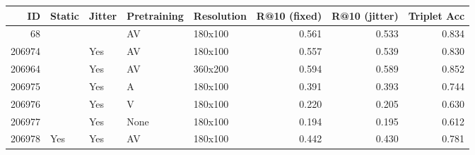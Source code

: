 \begin{tabular}{rllllrrr}
\toprule
    ID & Static & Jitter & Pretraining & Resolution &  R@10 (fixed) &  R@10 (jitter) &  Triplet Acc \\
\midrule
    68 &        &        &          AV &    180x100 &         0.561 &          0.533 &        0.834 \\
206974 &        &    Yes &          AV &    180x100 &         0.557 &          0.539 &        0.830 \\
206964 &        &    Yes &          AV &    360x200 &         0.594 &          0.589 &        0.852 \\
206975 &        &    Yes &           A &    180x100 &         0.391 &          0.393 &        0.744 \\
206976 &        &    Yes &           V &    180x100 &         0.220 &          0.205 &        0.630 \\
206977 &        &    Yes &        None &    180x100 &         0.194 &          0.195 &        0.612 \\
206978 &    Yes &    Yes &          AV &    180x100 &         0.442 &          0.430 &        0.781 \\
\bottomrule
\end{tabular}
